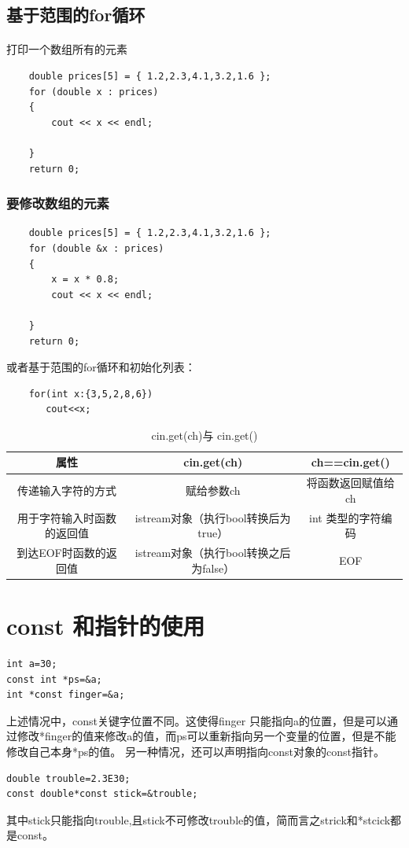 \documentclass[a4paper,12pt]{article}
\begin{document}
\begin{spacing}{2}
\subsection{基于范围的for循环}
\paragraph{ }打印一个数组所有的元素
\begin{lstlisting}
    double prices[5] = { 1.2,2.3,4.1,3.2,1.6 };
	for (double x : prices)
	{
		cout << x << endl;

	}
	return 0;
\end{lstlisting}
\subsubsection{要修改数组的元素}
\begin{lstlisting}
    double prices[5] = { 1.2,2.3,4.1,3.2,1.6 };
	for (double &x : prices)
	{
		x = x * 0.8;
		cout << x << endl;

	}
	return 0;
\end{lstlisting}
或者基于范围的for循环和初始化列表：
\begin{lstlisting}
    for(int x:{3,5,2,8,6})
       cout<<x;
\end{lstlisting}
\begin{center}
\begin{table}[ht]
\caption{cin.get(ch)与 cin.get()} %
\centering %
\begin{tabular}{c|c|c  } %
\hline\hline %
属性 &cin.get(ch) &ch==cin.get() \\ [0.5ex] %
\hline %
 传递输入字符的方式& 赋给参数ch & 将函数返回赋值给ch  \\
 \hline
用于字符输入时函数的返回值 & istream对象（执行bool转换后为true） & int 类型的字符编码  \\
\hline
到达EOF时函数的返回值& istream对象（执行bool转换之后为false） &EOF  \\
\hline %
\end{tabular}
\label{table:nonlin} %
\end{table}
\end{center}
\section{const 和指针的使用}
\begin{lstlisting}
int a=30;
const int *ps=&a;
int *const finger=&a;
\end{lstlisting}
上述情况中，const关键字位置不同。这使得finger 只能指向a的位置，但是可以通过修改*finger的值来修改a的值，而ps可以重新指向另一个变量的位置，但是不能修改自己本身*ps的值。
另一种情况，还可以声明指向const对象的const指针。
\begin{lstlisting}
double trouble=2.3E30;
const double*const stick=&trouble;
\end{lstlisting}
其中stick只能指向trouble,且stick不可修改trouble的值，简而言之strick和*stcick都是const。 
\end{spacing}
\end{document}
